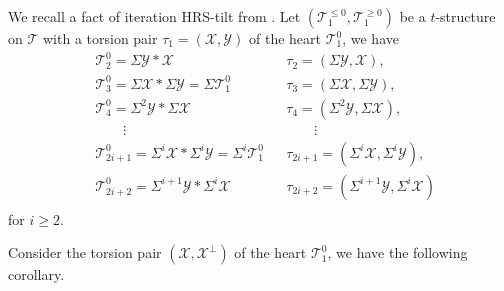 \documentclass[11pt,a4paper]{amsart}
\numberwithin{equation}{section} \theoremstyle{plain}
\numberwithin{equation}{section} \theoremstyle{definition}
\begin{document}
We recall a fact of iteration HRS-tilt from \cite[Chapter 1]{HRS}. Let $(\mathcal{T}_{1}^{\leq0},\mathcal{T}_{1}^{\geq0})$ be a $t$-structure on $\mathcal{T}$ with a torsion pair $\tau_{1}=(\mathcal{X},\mathcal{Y})$ of the heart $\mathcal{T}_{1}^{0}$, we have
\begin{align*}
&\mathcal{T}_{2}^{0}=\Sigma\mathcal{Y}\ast\mathcal{X} &&  \tau_{2}=(\Sigma\mathcal{Y},\mathcal{X}),\\
&\mathcal{T}_{3}^{0}=\Sigma\mathcal{X}\ast\Sigma\mathcal{Y}=\Sigma\mathcal{T}_{1}^{0} && \tau_{3}=(\Sigma\mathcal{X},\Sigma\mathcal{Y}),\\
&\mathcal{T}_{4}^{0}=\Sigma^{2}\mathcal{Y}\ast\Sigma\mathcal{X}&& \tau_{4}=(\Sigma^{2}\mathcal{Y},\Sigma\mathcal{X}),\\
&\qquad{\vdots}&& \qquad{\vdots}\\
&\mathcal{T}_{2i+1}^{0}=\Sigma^{i}\mathcal{X}\ast\Sigma^{i}\mathcal{Y}=\Sigma^{i}\mathcal{T}_{1}^{0} && \tau_{2i+1}=(\Sigma^{i}\mathcal{X},\Sigma^{i}\mathcal{Y}),\\
&\mathcal{T}_{2i+2}^{0}=\Sigma^{i+1}\mathcal{Y}\ast\Sigma^{i}\mathcal{X} && \tau_{2i+2}=(\Sigma^{i+1}\mathcal{Y},\Sigma^{i}\mathcal{X})\\
\end{align*}
for $i\geq2$.

Consider the torsion pair $(\mathcal{X},\mathcal{X}^{\perp})$ of the heart $\mathcal{T}_{1}^{0}$, we have the following corollary.
\end{document}
